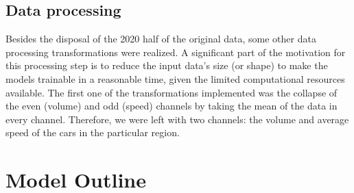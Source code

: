 \begin{table}[!h]
\centering
{}
\caption{Statistics for each channel in the specific snapshot}
\label{tab:data_analysis}
\end{table}

\subsection{Data processing}

Besides the disposal of the 2020 half of the original data, some other data processing transformations were realized. A significant part of the motivation for this processing step is to reduce the input data's size (or shape) to make the models trainable in a reasonable time, given the limited computational resources available. The first one of the transformations implemented was the collapse of the even (volume) and odd (speed) channels by taking the mean of the data in every channel. Therefore, we were left with two channels: the volume and average speed of the cars in the particular region.





\section{Model Outline}

